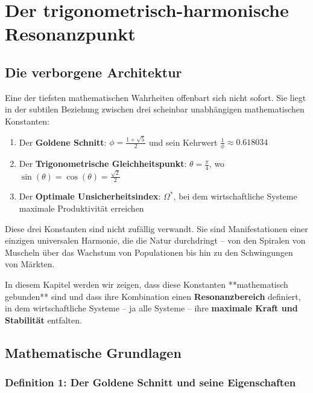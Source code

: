 \documentclass[a4paper, 12pt, twoside, openright]{report}
\theoremstyle{definition}
\theoremstyle{definition}
\begin{document}
\section{Der trigonometrisch-harmonische Resonanzpunkt}

\subsection{Die verborgene Architektur}

Eine der tiefsten mathematischen Wahrheiten offenbart sich nicht sofort. Sie liegt in der subtilen Beziehung zwischen drei scheinbar unabhängigen mathematischen Konstanten:

\begin{enumerate}
	\item Der \textbf{Goldene Schnitt}: $\phi = \frac{1+\sqrt{5}}{2}$ und sein Kehrwert $\frac{1}{\phi} \approx 0.618034$
	
	\item Der \textbf{Trigonometrische Gleichheitspunkt}: $\theta = \frac{\pi}{4}$, wo $\sin(\theta) = \cos(\theta) = \frac{\sqrt{2}}{2}$
	
	\item Der \textbf{Optimale Unsicherheitsindex}: $\Omega^*$, bei dem wirtschaftliche Systeme maximale Produktivität erreichen
\end{enumerate}

Diese drei Konstanten sind nicht zufällig verwandt. Sie sind Manifestationen einer einzigen universalen Harmonie, die die Natur durchdringt -- von den Spiralen von Muscheln über das Wachstum von Populationen bis hin zu den Schwingungen von Märkten.

In diesem Kapitel werden wir zeigen, dass diese Konstanten **mathematisch gebunden** sind und dass ihre Kombination einen \textbf{Resonanzbereich} definiert, in dem wirtschaftliche Systeme -- ja alle Systeme -- ihre \textbf{maximale Kraft und Stabilität} entfalten.

\subsection{Mathematische Grundlagen}

\subsubsection{Definition 1: Der Goldene Schnitt und seine Eigenschaften}
\end{document}
